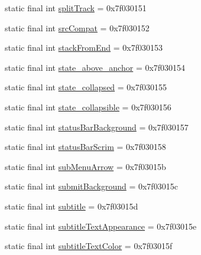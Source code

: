 \begin{DoxyCompactItemize}
\item 
static final int \mbox{\hyperlink{classandroid_1_1support_1_1design_1_1_r_1_1attr_a577a44a0a7299eea4cd856ceea540032}{split\+Track}} = 0x7f030151
\item 
static final int \mbox{\hyperlink{classandroid_1_1support_1_1design_1_1_r_1_1attr_ac91bf05ac7ffb9eae060e5565db9d50c}{src\+Compat}} = 0x7f030152
\item 
static final int \mbox{\hyperlink{classandroid_1_1support_1_1design_1_1_r_1_1attr_ab745dd7969ca01445b027b8a29076de5}{stack\+From\+End}} = 0x7f030153
\item 
static final int \mbox{\hyperlink{classandroid_1_1support_1_1design_1_1_r_1_1attr_a8eafe096a496ac81741c757ac0909925}{state\+\_\+above\+\_\+anchor}} = 0x7f030154
\item 
static final int \mbox{\hyperlink{classandroid_1_1support_1_1design_1_1_r_1_1attr_a357530c3caaaf03e14170466ce0c7312}{state\+\_\+collapsed}} = 0x7f030155
\item 
static final int \mbox{\hyperlink{classandroid_1_1support_1_1design_1_1_r_1_1attr_a93b11290cc862e34e79946b7c53808a6}{state\+\_\+collapsible}} = 0x7f030156
\item 
static final int \mbox{\hyperlink{classandroid_1_1support_1_1design_1_1_r_1_1attr_af517b42fef9de0ee9f0c072a68ed3def}{status\+Bar\+Background}} = 0x7f030157
\item 
static final int \mbox{\hyperlink{classandroid_1_1support_1_1design_1_1_r_1_1attr_af538f6ecd93db1a2674c631aced77466}{status\+Bar\+Scrim}} = 0x7f030158
\item 
static final int \mbox{\hyperlink{classandroid_1_1support_1_1design_1_1_r_1_1attr_a78e3c6c4af19cc821d1ba576114859ca}{sub\+Menu\+Arrow}} = 0x7f03015b
\item 
static final int \mbox{\hyperlink{classandroid_1_1support_1_1design_1_1_r_1_1attr_ad9be89c201a762e3bd82044528308173}{submit\+Background}} = 0x7f03015c
\item 
static final int \mbox{\hyperlink{classandroid_1_1support_1_1design_1_1_r_1_1attr_addd493f9beeeda303020cd3551494034}{subtitle}} = 0x7f03015d
\item 
static final int \mbox{\hyperlink{classandroid_1_1support_1_1design_1_1_r_1_1attr_a6ca00057c3d0f91c410d0a1dedae8ced}{subtitle\+Text\+Appearance}} = 0x7f03015e
\item 
static final int \mbox{\hyperlink{classandroid_1_1support_1_1design_1_1_r_1_1attr_a93636a8a2cbf8a8482c2de1404e776a5}{subtitle\+Text\+Color}} = 0x7f03015f
\item 

\end{DoxyCompactItemize}
